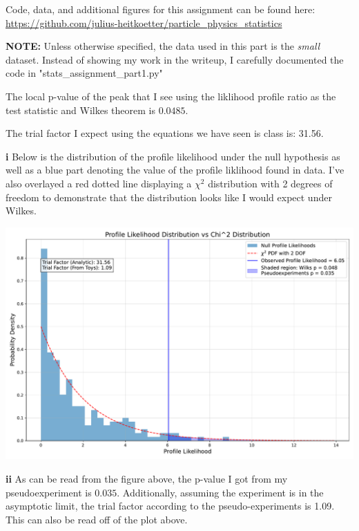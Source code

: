 \documentclass{6042}
\author{Julius Heitkoetter}
\begin{document}
Code, data, and additional figures for this assignment can be found here: \url{https://github.com/julius-heitkoetter/particle\_physics\_statistics}


\textbf{NOTE:} Unless otherwise specified, the data used in this part is the \textit{small} dataset. Instead of showing my work in the writeup, I carefully documented the code in "stats\_assignment\_part1.py"


The local p-value of the peak that I see using the liklihood profile ratio as the test statistic and Wilkes theorem is $0.0485.$


The trial factor I expect using the equations we have seen is class is: 31.56.


\textbf{i} Below is the distribution of the profile likelihood under the null hypothesis as well as a blue part denoting the value of the profile liklihood found in data. I've also overlayed a red dotted line displaying a $\chi^2$ distribution with 2 degrees of freedom to demonstrate that the distribution looks like I would expect under Wilkes. 

\begin{center}
    \includegraphics[scale=0.5]{images/part1_small_mMin105_mMax155/profile_liklihoods.pdf}
\end{center}

\textbf{ii} As can be read from the figure above, the p-value I got from my pseudoexperiment is $0.035$. Additionally, assuming the experiment is in the asymptotic limit, the trial factor according to the pseudo-experiments is 1.09. This can also be read off of the plot above.
\end{document}

